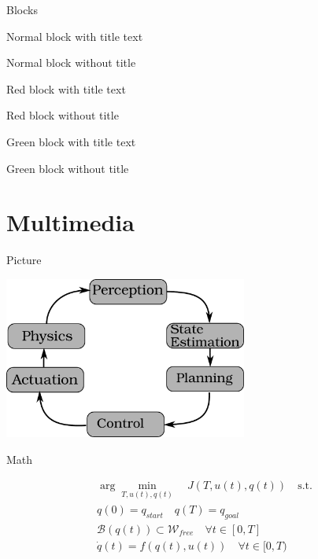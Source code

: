 \documentclass[aspectratio=169,xcolor={svgnames}]{beamer}
\begin{document}
  \begin{frame}{Blocks}

    \begin{myblock}{Normal block with title}
      text
    \end{myblock}

    \begin{myblock}{}
      Normal block without title
    \end{myblock}

    \begin{myalertblock}{Red block with title}
      text
    \end{myalertblock}

    \begin{myalertblock}{}
      Red block without title
    \end{myalertblock}

    \begin{myexampleblock}{Green block with title}
      text
    \end{myexampleblock}

    \begin{myexampleblock}{}
      Green block without title
    \end{myexampleblock}

  \end{frame}

  \section{Multimedia}

  \begin{frame}{Picture}
    
    \centering
    \includegraphics[width=0.6\textwidth]{images/robotics.pdf}

  \end{frame}

  \begin{frame}{Math}

    \begin{align*}
      \arg\min_{T, u(t), q(t)} \quad J(T, u(t), q(t)) \quad \text{s.t.}\\
      q(0) = q_{start} \quad q(T) = q_{goal}\\
      \mathcal{B}(q(t)) \subset \mathcal{W}_{free} \quad \forall t \in [0, T]\\
      \dot q(t) = f(q(t), u(t)) \quad \forall t \in [0, T)
    \end{align*}

  \end{frame}
\end{document}
